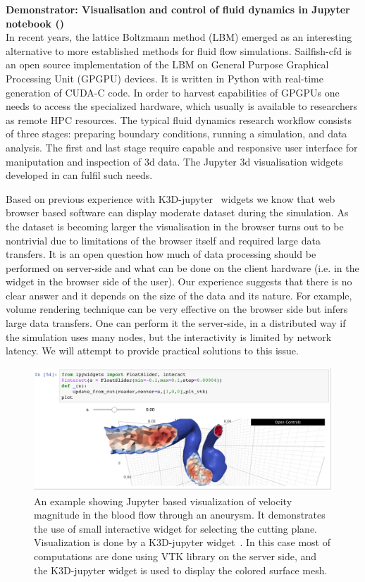 \medskip
\noindent\textbf{Demonstrator: Visualisation and control of fluid dynamics in
  Jupyter notebook ()}\label{sec:concept-demonstrator-gpu}\\
In recent years, the lattice Boltzmann method (LBM) emerged as an
interesting alternative to more established methods for fluid flow
simulations. Sailfish-cfd \cite{januszewski2014sailfish} is an open
source implementation of the LBM on General Purpose Graphical Processing
Unit (GPGPU) devices. It is written in Python with real-time
generation of CUDA-C code.  In order to harvest capabilities of GPGPUs
one needs to access the specialized hardware, which usually is
available to researchers as remote HPC resources.  The typical fluid
dynamics research workflow consists of three stages: preparing
boundary conditions, running a simulation, and data analysis. The
first and last stage require capable and responsive user interface for
maniputation and inspection of 3d data.  The Jupyter 3d visualisation
widgets developed in  can fulfil
such needs.

Based on previous experience with K3D-jupyter~\cite{K3D}
widgets we know that web browser based software can display moderate
dataset during the simulation. As the dataset is becoming larger the
visualisation in the browser turns out to be nontrivial due to
limitations of the browser itself and required large data transfers. It is
an open question how much of data processing should be performed on
server-side and what can be done on the client hardware (i.e. in the
widget in the browser side of the user). Our
experience suggests that there is no clear answer and it depends on
the size of the data and its nature. For example, volume rendering
technique can be very effective on the browser side but infers large data
transfers. One can perform it the server-side, in a distributed way if
the simulation uses many nodes, but the interactivity is limited by
network latency. We will attempt to provide practical
solutions to this issue.
%
  \begin{figure}[ht!]\centering
  \includegraphics[width=.95\textwidth]{images/k3d_cfd.png}
  \caption{An example showing Jupyter based visualization of velocity
    magnitude in the blood flow through an aneurysm. It demonstrates
    the use of small interactive widget for selecting the cutting
    plane.
    Visualization is done by a K3D-jupyter widget~\cite{K3D}.
    In this case most of computations are done using VTK library on
    the server side, and the K3D-jupyter widget is used to display the
    colored surface mesh.
  }\label{fig:k3d-cfd}
  \end{figure}

